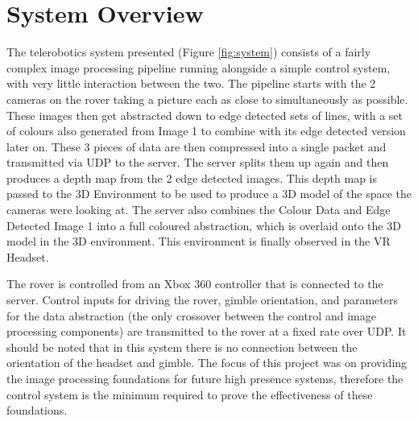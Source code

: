 \chapter{System Overview}
\label{chapter:system}

The telerobotics system presented (Figure \ref{fig:system}) consists of a fairly complex image processing pipeline running alongside a simple control system, with very little interaction between the two. The pipeline starts with the 2 cameras on the rover taking a picture each as close to simultaneously as possible. These images then get abstracted down to edge detected sets of lines, with a set of colours also generated from Image 1 to combine with its edge detected version later on. These 3 pieces of data are then compressed into a single packet and transmitted via UDP to the server. The server splits them up again and then produces a depth map from the 2 edge detected images. This depth map is passed to the 3D Environment to be used to produce a 3D model of the space the cameras were looking at. The server also combines the Colour Data and Edge Detected Image 1 into a full coloured abstraction, which is overlaid onto the 3D model in the 3D environment. This environment is finally observed in the VR Headset.

The rover is controlled from an Xbox 360 controller that is connected to the server. Control inputs for driving the rover, gimble orientation, and parameters for the data abstraction (the only crossover between the control and image processing components) are transmitted to the rover at a fixed rate over UDP. It should be noted that in this system there is no connection between the orientation of the headset and gimble. The focus of this project was on providing the image processing foundations for future high presence systems, therefore the control system is the minimum required to prove the effectiveness of these foundations.

